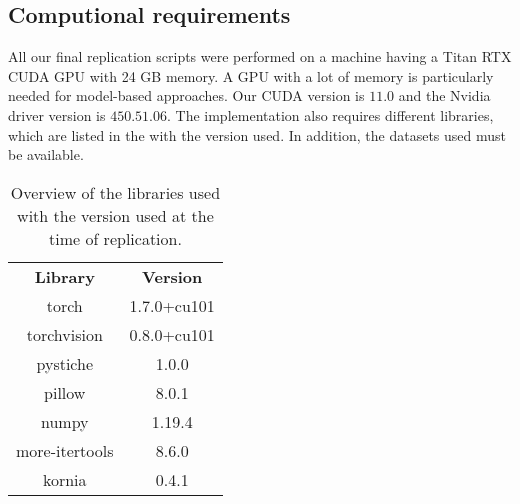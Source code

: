 \subsection{Computional requirements}

All our final replication scripts were performed on a machine having a Titan RTX CUDA GPU with 24 GB memory. A GPU with a lot of memory is particularly needed for model-based approaches. Our CUDA version is $11.0$ and the Nvidia driver version is $450.51.06$. The implementation also requires different libraries, which are listed in the   with the version used. In addition, the datasets used must be available. 

\begin{table*}[t]
	\renewcommand{\arraystretch}{1.3}
	\caption{Overview of the libraries used with the version used at the time of replication.}
	\label{tab:libraries}
	\centering
	\begin{tabular}{c|c}
		\hline
		\bfseries Library & \bfseries Version\\
		torch & 1.7.0+cu101\\
		torchvision &  0.8.0+cu101\\
		pystiche & 1.0.0\\
		pillow & 8.0.1\\
		numpy & 1.19.4\\
		more-itertools & 8.6.0\\
		kornia & 0.4.1 \\
		\hline
	\end{tabular}
\end{table*}